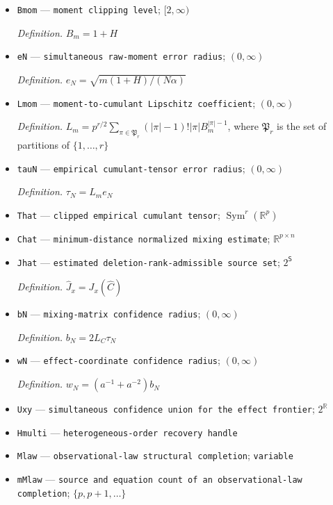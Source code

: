 \documentclass{article}
\begin{document}
\begin{itemize}
  \item \texttt{Bmom} --- \texttt{moment clipping level}; \([2,\infty)\)
  \par\smallskip\noindent\emph{Definition.} \(B_m=1+H\)
  \item \texttt{eN} --- \texttt{simultaneous raw-\allowbreak{}moment error radius}; \((0,\infty)\)
  \par\smallskip\noindent\emph{Definition.} \(e_N=\sqrt{m(1+H)/(N\alpha)}\)
  \item \texttt{Lmom} --- \texttt{moment-\allowbreak{}to-\allowbreak{}cumulant Lipschitz coefficient}; \((0,\infty)\)
  \par\smallskip\noindent\emph{Definition.} \(L_m=p^{r/2}\sum_{\pi\in\mathfrak P_r}(|\pi|-1)!|\pi|B_m^{|\pi|-1}\), where \(\mathfrak P_r\) is the set of partitions of \(\{1,\ldots,r\}\)
  \item \texttt{tauN} --- \texttt{empirical cumulant-\allowbreak{}tensor error radius}; \((0,\infty)\)
  \par\smallskip\noindent\emph{Definition.} \(\tau_N=L_m e_N\)
  \item \texttt{That} --- \texttt{clipped empirical cumulant tensor}; \(\operatorname{Sym}^r(\mathbb R^p)\)
  \item \texttt{Chat} --- \texttt{minimum-\allowbreak{}distance normalized mixing estimate}; \(\mathbb R^{p\times n}\)
  \item \texttt{Jhat} --- \texttt{estimated deletion-\allowbreak{}rank-\allowbreak{}admissible source set}; \(2^{\mathsf S}\)
  \par\smallskip\noindent\emph{Definition.} \(\widehat J_x=J_x(\widehat C)\)
  \item \texttt{bN} --- \texttt{mixing-\allowbreak{}matrix confidence radius}; \((0,\infty)\)
  \par\smallskip\noindent\emph{Definition.} \(b_N=2L_C\tau_N\)
  \item \texttt{wN} --- \texttt{effect-\allowbreak{}coordinate confidence radius}; \((0,\infty)\)
  \par\smallskip\noindent\emph{Definition.} \(w_N=(a^{-1}+a^{-2})b_N\)
  \item \texttt{Uxy} --- \texttt{simultaneous confidence union for the effect frontier}; \(2^{\mathbb R}\)
  \item \texttt{Hmulti} --- \texttt{heterogeneous-\allowbreak{}order recovery handle}
  \item \texttt{Mlaw} --- \texttt{observational-\allowbreak{}law structural completion}; \texttt{variable}
  \item \texttt{mMlaw} --- \texttt{source and equation count of an observational-\allowbreak{}law completion}; \(\{p,p+1,\ldots\}\)

\end{itemize}
\end{document}
